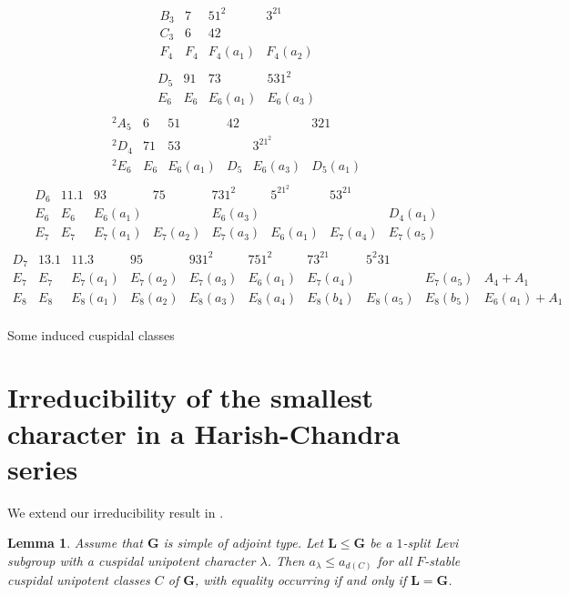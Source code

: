 \documentclass[12pt,leqno,a4paper]{amsart}
\newcommand{\bG}{{\mathbf{G}}}
\newcommand{\bL}{{\mathbf{L}}}
\newcommand{\tw}[1]{{}^{#1}\!}
\let\la=\lambda
\newtheorem{lem}[thm]{Lemma}
\theoremstyle{remark}
\begin{document}
\begin{table}[htbp]
\[\begin{array}{c|ccc}
  B_3 & 7 & 51^2 & 3^21 \\
  C_3 & 6 & 42 \\\hline
  F_4 & F_4 & F_4(a_1) & F_4(a_2)\\
\end{array}\]\smallskip
\[\begin{array}{c|ccc}
  D_5 & 91 & 73 & 531^2\\\hline
  E_6 & E_6 & E_6(a_1) & E_6(a_3)\\
\end{array}\]\smallskip
\[\begin{array}{c|ccccc}
  \tw2A_5 & 6 & 51 & 42 & & 321 \\
  \tw2D_4 & 71 & 53 & & 3^21^2\\\hline
  \tw2E_6 & E_6 & E_6(a_1) & D_5 & E_6(a_3) & D_5(a_1)\\
\end{array}\]\smallskip
\[\begin{array}{c|ccccccc}
  D_6 & 11.1 & 93 & 75 & 731^2 & 5^21^2 & 53^21 \\
  E_6 & E_6 & E_6(a_1) & & E_6(a_3) & & & D_4(a_1) \\\hline
  E_7 & E_7 & E_7(a_1) & E_7(a_2) & E_7(a_3) & E_6(a_1) & E_7(a_4) & E_7(a_5)\\
\end{array}\]\smallskip
\[\begin{array}{c|ccccccccc}
  D_7 & 13.1 & 11.3 & 95 & 931^2 & 751^2 & 73^21 & 5^2 31 \\
  E_7 & E_7 & E_7(a_1) & E_7(a_2) & E_7(a_3) & E_6(a_1) & E_7(a_4) & & E_7(a_5)  & A_4+A_1 \\\hline
  E_8 & E_8 & E_8(a_1) & E_8(a_2) & E_8(a_3) & E_8(a_4) & E_8(b_4) & E_8(a_5) & E_8(b_5) &  E_6(a_1)+A_1\\
\end{array}\]
 \caption{Some induced cuspidal classes}  \label{tab:ind-cusp-exc}
\end{table}


\section{Irreducibility of the smallest character in a Harish-Chandra series}
We extend our irreducibility result in \cite[Thm.~A]{DM17}.

\begin{lem}   \label{lem:all types}
 Assume that $\bG$ is simple of adjoint type. Let $\bL\le\bG$ be a $1$-split
 Levi subgroup with a cuspidal unipotent character $\la$.
 Then $a_\la\le a_{d(C)}$ for all $F$-stable cuspidal unipotent classes $C$
 of $\bG$, with equality occurring if and only if $\bL=\bG$.
\end{lem}
\end{document}
